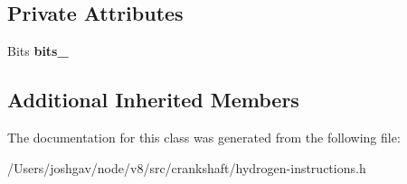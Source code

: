 \subsection*{Private Attributes}
\begin{DoxyCompactItemize}
\item 
Bits {\bfseries bits\+\_\+}\hypertarget{classv8_1_1internal_1_1_h_double_bits_acb5a7f3a344a5f3ade1fb3531dd109d1}{}\label{classv8_1_1internal_1_1_h_double_bits_acb5a7f3a344a5f3ade1fb3531dd109d1}

\end{DoxyCompactItemize}
\subsection*{Additional Inherited Members}


The documentation for this class was generated from the following file\+:\begin{DoxyCompactItemize}
\item 
/\+Users/joshgav/node/v8/src/crankshaft/hydrogen-\/instructions.\+h\end{DoxyCompactItemize}
